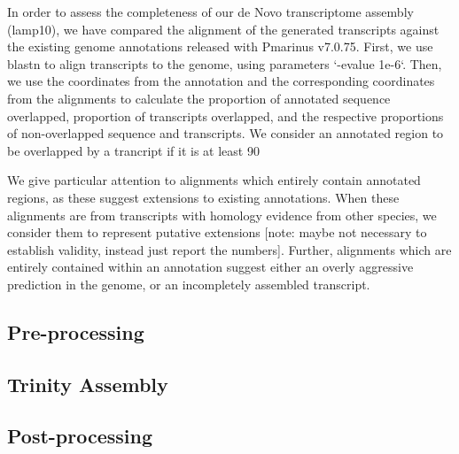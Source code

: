 \documentclass{article}
\begin{document}

In order to assess the completeness of our de Novo transcriptome assembly (lamp10), we have compared the alignment of the generated transcripts against the existing genome annotations released with Pmarinus v7.0.75. First, we use blastn to align transcripts to the genome, using parameters `-evalue 1e-6`. Then, we use the coordinates from the annotation and the corresponding coordinates from the alignments to calculate the proportion of annotated sequence overlapped, proportion of transcripts overlapped, and the respective proportions of non-overlapped sequence and transcripts. We consider an annotated region to be overlapped by a trancript if it is at least 90%

We give particular attention to alignments which entirely contain annotated regions, as these suggest extensions to existing annotations. When these alignments are from transcripts with homology evidence from other species, we consider them to represent putative extensions [note: maybe not necessary to establish validity, instead just report the numbers]. Further, alignments which are entirely contained within an annotation suggest either an overly aggressive prediction in the genome, or an incompletely assembled transcript. 



\subsection*{Pre-processing}


\subsection*{Trinity Assembly}

\subsection*{Post-processing}


\end{document}
